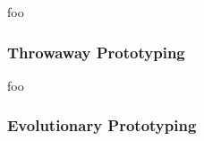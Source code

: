 foo





\subsubsection{Throwaway Prototyping}









foo


\subsubsection{Evolutionary Prototyping}


